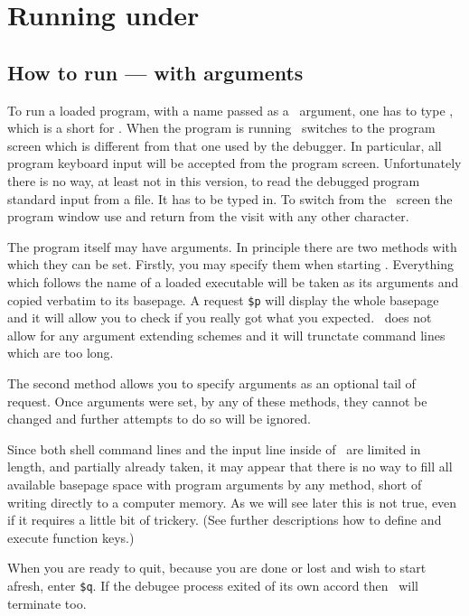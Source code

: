 \section{Running under \szadb}

\subsection{How to run --- with arguments}
To run a loaded program, with a name passed as a \szadb\ argument,
one has to type , which is a short for .
When the program is running \szadb\ switches to the program screen which
is different from that one used by the debugger.
In particular, all program keyboard input will be accepted from the program
screen.  Unfortunately there is no way, at least not in this version,
to read the debugged program standard input from a file.  It has to
be typed in.
To switch from the \szadb\ screen the program window use 
and return from the visit with any other character.

The program itself may have arguments.  In principle there are
two methods with which they can be set.
Firstly, you may specify them when starting \szadb.
Everything which
follows the name of a loaded executable will be taken as its arguments
and copied verbatim to its basepage. A request \verb|$p| will display the
whole basepage and it will allow you to check if you really got what
you expected.
\szadb\ does not allow for any argument extending schemes
and it will trunctate command lines which are too long.

The second method allows you to specify arguments as an optional tail
of  request.  Once arguments were set, by any of these methods,
they cannot be changed and further attempts to do so will be ignored.

Since both shell command lines and 
the input line inside of \szadb\ are limited in length,
and partially already taken,
it may appear that there is no way to fill all available basepage
space with program arguments by any method,
short of writing directly to a computer memory.
As we will see later this is not true, even if 
it requires a little bit of trickery.
(See further descriptions how to define and execute function keys.)

When you are ready to quit, because you are done or lost and wish to start
afresh, enter \verb|$q|. If the debugee process exited of its own accord
then \szadb\ will terminate too.

